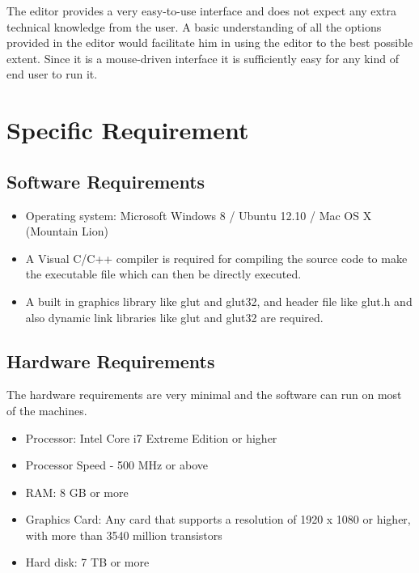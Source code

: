 \documentclass[12pt]{report}
\begin{document}
The editor provides a very easy-to-use interface and does not expect any extra technical knowledge from the user. A basic understanding of all the options provided in the editor would facilitate him in using the editor to the best possible extent. Since it is a mouse-driven interface it is sufficiently easy for any kind of end user to run it. 

\section{Specific Requirement}


\subsection{Software Requirements}

\begin{itemize}
\item{}	Operating system: Microsoft Windows 8 / Ubuntu 12.10 / Mac OS X (Mountain Lion)
\item{}	A Visual C/C++ compiler is required for compiling the source code to make the executable file which can then be directly executed.
\item{}	A built in graphics library like glut and glut32, and header file like glut.h and also dynamic link libraries like glut and glut32 are required.
\end{itemize}
\subsection{Hardware Requirements}
The hardware requirements are very minimal and the software can run on most of the machines. 
\begin{itemize}
\item{}	Processor: Intel Core i7 Extreme Edition or higher
\item{}	Processor Speed - 500 MHz or above 
\item{}	RAM: 8 GB or more
\item{}	Graphics Card: Any card that supports a resolution of 1920 x 1080 or higher, with more than 3540 million transistors
\item{} Hard disk: 7 TB or more

\end{itemize}



\pagestyle{fancy}
\chead{}
\rfoot{\small{\thepage}}
\renewcommand{\headrulewidth}{0.4pt}
\renewcommand{\footrulewidth}{0.4pt}
\end{document}

